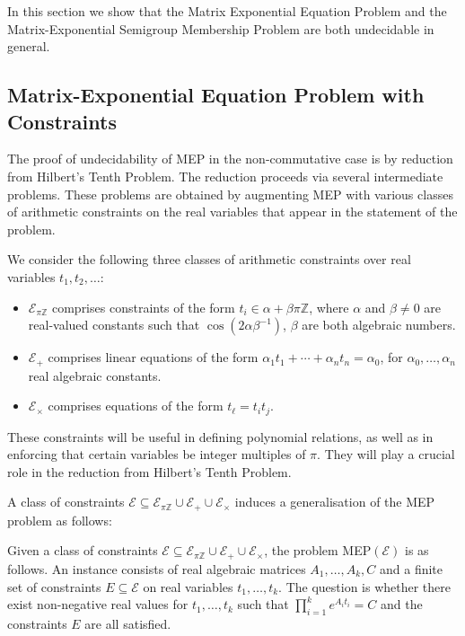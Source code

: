 \documentclass[format=acmsmall, review=false, screen=true]{acmart}
\newcommand{\Integers}{\mathbb{Z}}
\begin{document}
In this section we show that the Matrix Exponential Equation Problem
and the Matrix-Exponential Semigroup Membership Problem are both
undecidable in general.

\subsection{Matrix-Exponential Equation Problem with Constraints}

The proof of undecidability of  MEP in the non-commutative case is
by reduction from Hilbert's Tenth Problem.  The reduction proceeds via
several intermediate problems.  These problems are obtained by
augmenting MEP with various classes of arithmetic constraints on the
real variables that appear in the statement of the problem.

\begin{definition}
  We consider the following three classes of arithmetic constraints
  over real variables $t_1,t_2,\ldots$:
\begin{itemize}
\item $\mathcal{E}_{\pi\Integers}$ comprises constraints of the form
  $t_{i}\in\alpha+\beta\pi\Integers$, where $\alpha$ and $\beta\neq 0$
  are real-valued constants such that $\cos(2\alpha\beta^{-1})$,
  $\beta$ are both algebraic numbers.
\item $\mathcal{E}_{+}$ comprises linear equations of the form
  $\alpha_1 t_1 + \cdots + \alpha_n t_n = \alpha_0 $, for
  $\alpha_0,\ldots,\alpha_n$ real algebraic constants.
\item $\mathcal{E}_{\times}$ comprises equations of the form
  $t_{\ell} = t_{i} t_{j}$.
\end{itemize}
\end{definition}

These constraints will be useful in defining polynomial relations, as well as in enforcing
that certain variables be integer multiples of $\pi$. They will play a crucial role in the
reduction from Hilbert's Tenth Problem.

A class of constraints $\mathcal{E} \subseteq \mathcal{E}_{\pi\Integers} \cup
\mathcal{E}_{+}\cup \mathcal{E}_{\times}$
induces a generalisation of the MEP problem as follows:
\begin{definition}
  Given a class of constraints
  $\mathcal{E} \subseteq \mathcal{E}_{\pi\Integers} \cup
  \mathcal{E}_{+}\cup \mathcal{E}_{\times}$,
  the problem MEP$(\mathcal{E})$ is as follows.  An instance consists
  of real algebraic matrices $A_1,\ldots,A_k,C$ and a finite set of
  constraints $E\subseteq\mathcal{E}$ on real variables
  $t_1,\ldots,t_k$.  The question is whether there exist non-negative
  real values for $t_1,\ldots,t_k$ such that
  $\prod_{i=1}^{k} e^{A_{i} t_{i}}=C$ and the constraints $E$ are all
  satisfied.
\label{def:contraintMEP}
\end{definition}
\end{document}
